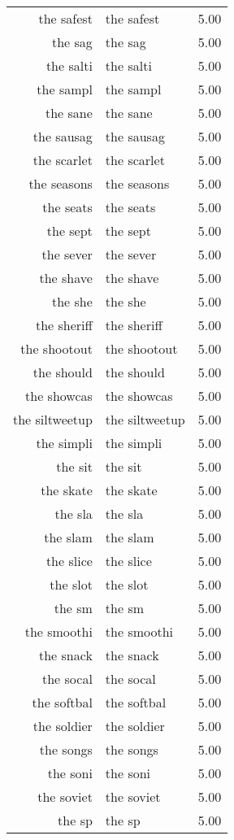 \begin{table}[ht]
\begin{tabular}{rlr}
  the safest & the safest & 5.00 \\ 
  the sag & the sag & 5.00 \\ 
  the salti & the salti & 5.00 \\ 
  the sampl & the sampl & 5.00 \\ 
  the sane & the sane & 5.00 \\ 
  the sausag & the sausag & 5.00 \\ 
  the scarlet & the scarlet & 5.00 \\ 
  the seasons & the seasons & 5.00 \\ 
  the seats & the seats & 5.00 \\ 
  the sept & the sept & 5.00 \\ 
  the sever & the sever & 5.00 \\ 
  the shave & the shave & 5.00 \\ 
  the she & the she & 5.00 \\ 
  the sheriff & the sheriff & 5.00 \\ 
  the shootout & the shootout & 5.00 \\ 
  the should & the should & 5.00 \\ 
  the showcas & the showcas & 5.00 \\ 
  the siltweetup & the siltweetup & 5.00 \\ 
  the simpli & the simpli & 5.00 \\ 
  the sit & the sit & 5.00 \\ 
  the skate & the skate & 5.00 \\ 
  the sla & the sla & 5.00 \\ 
  the slam & the slam & 5.00 \\ 
  the slice & the slice & 5.00 \\ 
  the slot & the slot & 5.00 \\ 
  the sm & the sm & 5.00 \\ 
  the smoothi & the smoothi & 5.00 \\ 
  the snack & the snack & 5.00 \\ 
  the socal & the socal & 5.00 \\ 
  the softbal & the softbal & 5.00 \\ 
  the soldier & the soldier & 5.00 \\ 
  the songs & the songs & 5.00 \\ 
  the soni & the soni & 5.00 \\ 
  the soviet & the soviet & 5.00 \\ 
  the sp & the sp & 5.00 \\ 

\end{tabular}
\end{table}
